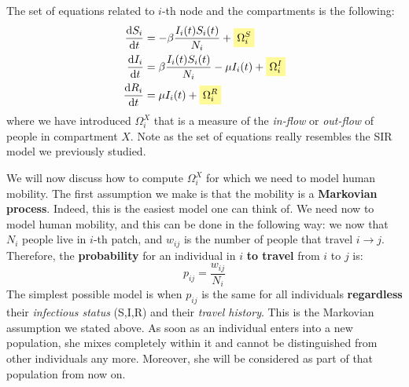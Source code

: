 \documentclass[../main/main.tex]{subfiles}
\begin{document}
The set of equations related to $i$-th node and the compartments is the following:
\begin{subequations}
\begin{align}
    \dv{S_i}{t}  &= -\beta \frac{I_i(t)S_i(t)}{N_i} + \mathcolorbox{yellow!40}{\Omega_i^S}\\
    \dv{I_i}{t} &= \beta \frac{I_i(t)S_i(t)}{N_i}  - \mu I_i(t) + \mathcolorbox{yellow!40}{\Omega_i^I}\\
    \dv{R_i}{t} &= \mu I_i (t) + \mathcolorbox{yellow!40}{\Omega_i^R}
\end{align}
\end{subequations}
where we have introduced $\Omega_i^X$ that is a measure of the \textit{in-flow} or \textit{out-flow} of people in compartment $X$. Note as the set of equations really resembles the SIR model we previously studied.


We will now discuss how to compute $\Omega_i^X$ for which we need to model human mobility. The first assumption we make is that the mobility is a \textbf{Markovian process}. Indeed, this is the easiest model one can think of. We need now to model human mobility, and this can be done in the following way: we now that $N_i$ people live in $i$-th patch, and $w_{ij}$ is the number of people that travel $i \to j$. Therefore, the \textbf{probability} for an individual in $i$ \textbf{to travel} from $i$ to $j$ is:
\begin{equation}
    p_{ij} = \frac{w_{ij}}{N_i}
\end{equation}
The simplest possible model is when $p_{ij}$ is the same for all individuals \textbf{regardless} their \textit{infectious status} (S,I,R) and their \textit{travel history}. This is the Markovian assumption we stated above. As soon as an individual enters into a new population, she mixes completely within it and cannot be distinguished from other individuals any more. Moreover, she will be considered as part of that population from now on.
\end{document}
